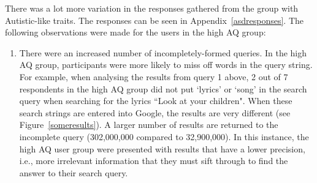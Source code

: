\documentclass[a4paper, 11pt]{article}
\begin{document}
There was a lot more variation in the responses gathered from the group with Autistic-like traits. The responses can be seen in Appendix~\ref{asdresponses}. The following observations were made for the users in the high AQ group:
\begin{enumerate}
\item{There were an increased number of incompletely-formed queries. In the high AQ group, participants were more likely to miss off words in the query string. For example, when analysing the results from query 1 above, 2 out of 7 respondents in the high AQ group did not put `lyrics' or `song' in the search query when searching for the lyrics ``Look at your children". When these search strings are entered into Google, the results are very different (see Figure~\ref{someresults}). A larger number of results are returned to the incomplete query (302,000,000 compared to 32,900,000). In this instance, the high AQ user group were presented with results that have a lower precision, i.e., more irrelevant information that they must sift through to find the answer to their search query.}
\label{incomplete}


\end{enumerate}
\end{document}
